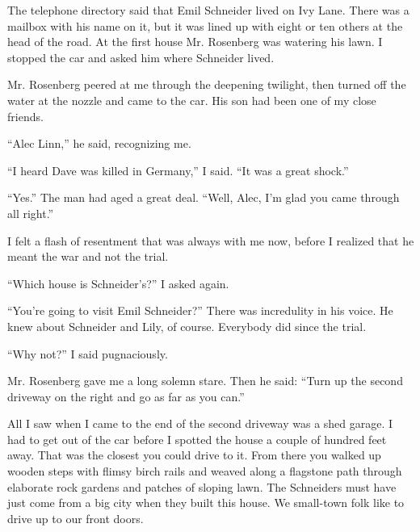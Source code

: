 \documentclass{novel}
\begin{document}
\vspace{2\nbs}
\clearpage
\thispagestyle{empty}
\begin{ChapterStart}
\vspace{3\nbs}
\end{ChapterStart}

The telephone directory said that Emil Schneider lived on Ivy Lane. There was a mailbox with his name on it, but it was lined up with eight or ten others at the head of the road. At the first house Mr. Rosenberg was watering his lawn. I stopped the car and asked him where Schneider lived.

Mr. Rosenberg peered at me through the deepening twilight, then turned off the water at the nozzle and came to the car. His son had been one of my close friends.

“Alec Linn,” he said, recognizing me.

“I heard Dave was killed in Germany,” I said. “It was a great shock.”

“Yes.” The man had aged a great deal. “Well, Alec, I’m glad you came through all right.”

I felt a flash of resentment that was always with me now, before I realized that he meant the war and not the trial.

“Which house is Schneider’s?” I asked again.

“You’re going to visit Emil Schneider?” There was incredulity in his voice. He knew about Schneider and Lily, of course. Everybody did since the trial.

“Why not?” I said pugnaciously.

Mr. Rosenberg gave me a long solemn stare. Then he said: “Turn up the second driveway on the right and go as far as you can.”

All I saw when I came to the end of the second driveway was a shed garage. I had to get out of the car before I spotted the house a couple of hundred feet away. That was the closest you could drive to it. From there you walked up wooden steps with flimsy birch rails and weaved along a flagstone path through elaborate rock gardens and patches of sloping lawn. The Schneiders must have just come from a big city when they built this house. We small-town folk like to drive up to our front doors.
\end{document}
